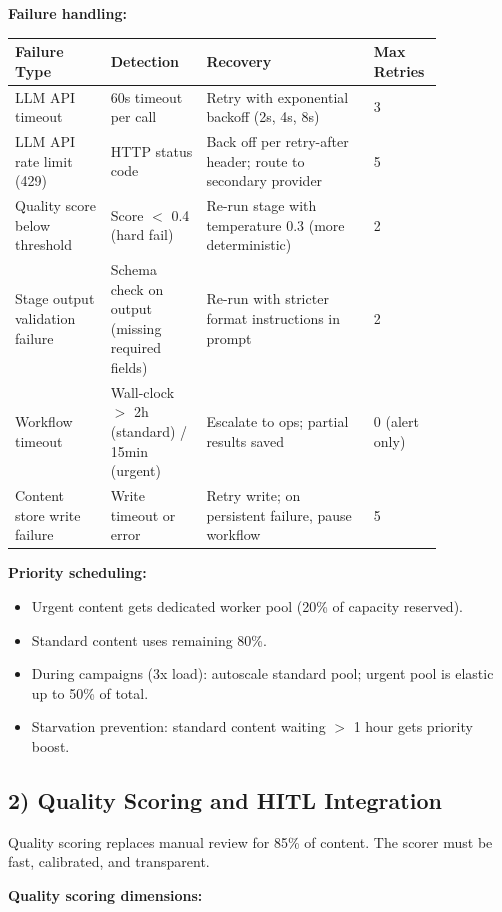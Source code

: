 \textbf{Failure handling:}

\begin{tabular}{|p{0.20\linewidth}|p{0.20\linewidth}|p{0.35\linewidth}|p{0.10\linewidth}|}
\hline
\textbf{Failure Type} & \textbf{Detection} & \textbf{Recovery} & \textbf{Max Retries} \\
\hline
LLM API timeout & 60s timeout per call & Retry with exponential backoff (2s, 4s, 8s) & 3 \\
\hline
LLM API rate limit (429) & HTTP status code & Back off per retry-after header; route to secondary provider & 5 \\
\hline
Quality score below threshold & Score $<$ 0.4 (hard fail) & Re-run stage with temperature 0.3 (more deterministic) & 2 \\
\hline
Stage output validation failure & Schema check on output (missing required fields) & Re-run with stricter format instructions in prompt & 2 \\
\hline
Workflow timeout & Wall-clock $>$ 2h (standard) / 15min (urgent) & Escalate to ops; partial results saved & 0 (alert only) \\
\hline
Content store write failure & Write timeout or error & Retry write; on persistent failure, pause workflow & 5 \\
\hline
\end{tabular}

\textbf{Priority scheduling:}

\begin{itemize}
  \item Urgent content gets dedicated worker pool (20\% of capacity reserved).
  \item Standard content uses remaining 80\%.
  \item During campaigns (3x load): autoscale standard pool; urgent pool is elastic up to 50\% of total.
  \item Starvation prevention: standard content waiting $>$ 1 hour gets priority boost.
\end{itemize}

\subsection*{2) Quality Scoring and HITL Integration}

Quality scoring replaces manual review for 85\% of content. The scorer must be fast, calibrated, and transparent.

\textbf{Quality scoring dimensions:}

